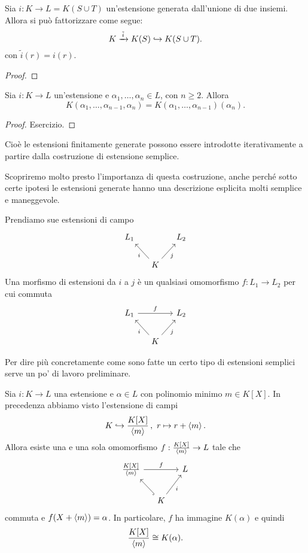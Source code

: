 \begin{prop}
Sia \(i : K \to L = K(S \cup T)\) un'estensione generata dall'unione di due insiemi. Allora si può fattorizzare come segue:
\[K \xrightarrow{\,\tilde i\,} K(S) \hookrightarrow K(S \cup T) .\]
con \(\tilde i (r) = i(r)\).
\end{prop}

\begin{proof}
\end{proof}

\begin{prop}
Sia \(i : K \to L\) un'estensione e \(\alpha_1, \dots{}, \alpha_n \in L\), con \(n \ge 2\). Allora
\[K\left(\alpha_1, \dots{}, \alpha_{n-1}, \alpha_n\right) = K\left(\alpha_1, \dots{}, \alpha_{n-1}\right)\left(\alpha_n\right). \]
\end{prop}

\begin{proof}
Esercizio.
\end{proof}

Cioè le estensioni finitamente generate possono essere introdotte iterativamente a partire dalla costruzione di estensione semplice.

Scopriremo molto presto l'importanza di questa costruzione, anche perché sotto certe ipotesi le estensioni generate hanno una descrizione esplicita molti semplice e maneggevole. 

\begin{defi}
Prendiamo sue estensioni di campo
\[\begin{tikzcd}[column sep=small]
L_1 & & L_2 \\
& K \ar["i", ul] \ar["j", ur, swap] &
\end{tikzcd}\]
Una morfismo di estensioni da \(i\) a \(j\) è un qualsiasi omomorfismo \(f : L_1 \to L_2\) per cui commuta
\[\begin{tikzcd}[column sep=small]
L_1 \ar["f", rr] & & L_2 \\
& K \ar["i", ul] \ar["j", ur, swap] &
\end{tikzcd}\] 
\end{defi}

Per dire più concretamente come sono fatte un certo tipo di estensioni semplici serve un po' di lavoro preliminare.

\begin{prop}\label{prop:IsomorfismoEstensioneGenerataDaElementoAlgebrico}
Sia \(i : K \to L\) una estensione e \(\alpha \in L\) con polinomio minimo \(m \in K[X]\). In precedenza abbiamo visto l'estensione di campi
\[K \hookrightarrow \frac{K[X]}{\left\langle m\right\rangle}\,,\ r \mapsto r + \left\langle m\right\rangle .\]
Allora esiste una e una sola omomorfismo \(f : \frac{K[X]}{\left\langle m\right\rangle} \to L\) tale che
\[\begin{tikzcd}[column sep=small]
\frac{K[X]}{\gen m} \ar["f", rr] & & L \\
& K \ar[hookrightarrow, ul] \ar["i", ur, swap] &
\end{tikzcd}\]
commuta e \(f(X+ \left\langle m\right\rangle) = \alpha\). In particolare, \(f\) ha immagine \(K(\alpha)\) e quindi
\[\frac{K[X]}{\left\langle m\right\rangle} \cong K(\alpha) .\]
\end{prop}

